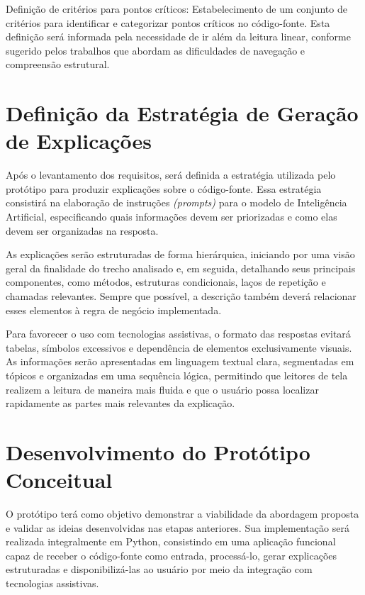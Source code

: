\documentclass[
    12pt,                   %
    openright,              %
    oneside,                %
    a4paper,                %
    sumario=tradicional,    %
    english,                %
    brazil,                 %
    ]{abntex2}
\begin{document}
Definição de critérios para pontos críticos: Estabelecimento de um conjunto de critérios para identificar e categorizar pontos críticos no código-fonte. Esta definição será informada pela necessidade de ir além da leitura linear, conforme sugerido pelos trabalhos que abordam as dificuldades de navegação e compreensão estrutural.

\section{Definição da Estratégia de Geração de Explicações}

Após o levantamento dos requisitos, será definida a estratégia utilizada pelo protótipo para produzir explicações sobre o código-fonte. Essa estratégia consistirá na elaboração de instruções \textit{(prompts)} para o modelo de Inteligência Artificial, especificando quais informações devem ser priorizadas e como elas devem ser organizadas na resposta.

As explicações serão estruturadas de forma hierárquica, iniciando por uma visão geral da finalidade do trecho analisado e, em seguida, detalhando seus principais componentes, como métodos, estruturas condicionais, laços de repetição e chamadas relevantes. Sempre que possível, a descrição também deverá relacionar esses elementos à regra de negócio implementada.

Para favorecer o uso com tecnologias assistivas, o formato das respostas evitará tabelas, símbolos excessivos e dependência de elementos exclusivamente visuais. As informações serão apresentadas em linguagem textual clara, segmentadas em tópicos e organizadas em uma sequência lógica, permitindo que leitores de tela realizem a leitura de maneira mais fluida e que o usuário possa localizar rapidamente as partes mais relevantes da explicação.


\section{Desenvolvimento do Protótipo Conceitual}

O protótipo terá como objetivo demonstrar a viabilidade da abordagem proposta e validar as ideias desenvolvidas nas etapas anteriores. Sua implementação será realizada integralmente em Python, consistindo em uma aplicação funcional capaz de receber o código-fonte como entrada, processá-lo, gerar explicações estruturadas e disponibilizá-las ao usuário por meio da integração com tecnologias assistivas.
\end{document}
